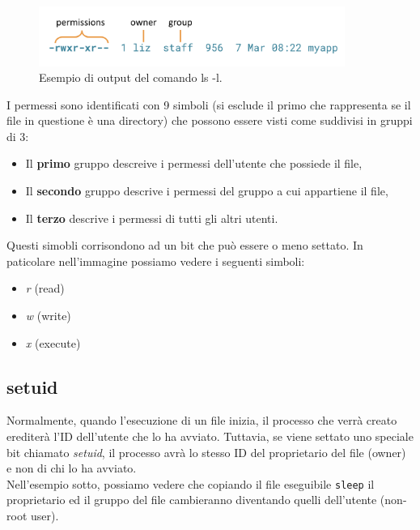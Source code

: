 \begin{figure}[H]
    \centering
    \includegraphics[width=10cm, keepaspectratio]{capitoli/os_security/imgs/permessi.png}
    \caption{Esempio di output del comando ls -l.}
\end{figure}

I permessi sono identificati con 9 simboli (si esclude il primo che rappresenta
se il file in questione è una directory) che possono essere visti come suddivisi
in gruppi di 3:

\begin{itemize}
    \item Il \textbf{primo} gruppo descreive i permessi dell'utente che possiede il file,
    \item Il \textbf{secondo} gruppo descrive i permessi del gruppo a cui appartiene il file,
    \item Il \textbf{terzo} descrive i permessi di tutti gli altri utenti.
\end{itemize}

Questi simobli corrisondono ad un bit che può essere o meno settato. In paticolare
nell'immagine possiamo vedere i seguenti simboli:

\begin{itemize}
    \item \textit{r} (read)
    \item \textit{w} (write)
    \item \textit{x} (execute)
\end{itemize}

\subsection{setuid}

Normalmente, quando l'esecuzione di un file inizia, il processo che verrà creato
erediterà l'ID dell'utente che lo ha avviato. Tuttavia, se viene settato uno speciale
bit chiamato \textit{setuid}, il processo avrà lo stesso ID del proprietario
del file (owner) e non di chi lo ha avviato.\\

Nell'esempio sotto, possiamo vedere che copiando il file eseguibile \verb|sleep|
il proprietario ed il gruppo del file cambieranno diventando quelli dell'utente
(non-root user).

